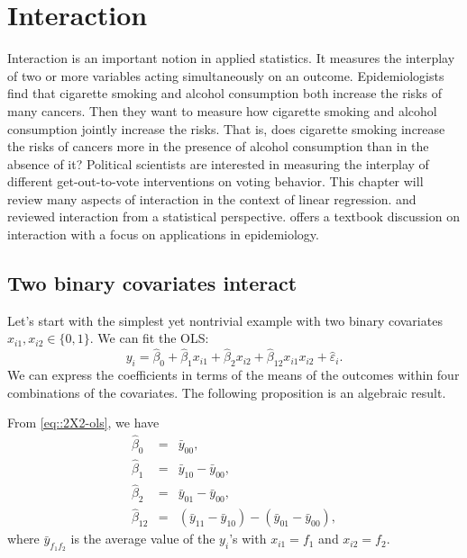  
\chapter{Interaction}\label{chapter::interaction}
 
 Interaction is an important notion in applied statistics. It measures the interplay of two or more variables acting simultaneously on an outcome. Epidemiologists find that cigarette smoking and alcohol consumption both increase the risks of many cancers. Then they want to measure how cigarette smoking and alcohol consumption jointly increase the risks. That is, does cigarette smoking increase the risks of cancers more in the presence of alcohol consumption than in the absence of it? Political scientists are interested in measuring the interplay of different get-out-to-vote interventions on voting behavior. This chapter will review many aspects of interaction in the context of linear regression. \citet{Cox:1984tx} and \citet{berrington2007interpretation} reviewed interaction from a statistical perspective. \citet{Vanderweele::2015} offers a textbook discussion on interaction with a focus on applications in epidemiology. 
 
 
 
  
\section{Two binary covariates interact} 

Let's start with the simplest yet nontrivial example with two binary covariates $x_{i1}, x_{i2} \in \{0, 1\}$. We can fit the OLS:
\begin{equation}
\label{eq::2X2-ols}
y_i=\hat{\beta}_{0}+\hat{\beta}_{1} x_{i1}+\hat{\beta}_{2} x_{i2}+\hat{\beta}_{12} x_{i1} x_{i2}+\hat{\varepsilon}_i. 
\end{equation}
We can express the coefficients in terms of the means of the outcomes within four combinations of the covariates. The following proposition
is an algebraic result.


\begin{proposition}\label{proposition::2X2-ols}
From \eqref{eq::2X2-ols}, we have
\begin{eqnarray*} 
\hat{\beta}_{0} &=& \bar{y}_{00}, \\
\hat{\beta}_{1} &=& \bar{y}_{10} - \bar{y}_{00}, \\
\hat{\beta}_{2} &=& \bar{y}_{01}-\bar{y}_{00}, \\
\hat{\beta}_{12} &=& (\bar{y}_{11}-\bar{y}_{10})-(\bar{y}_{01}-\bar{y}_{00}),   
\end{eqnarray*} 
where $\bar{y}_{f_{1}f_{2}}$ is the average value of the $y_{i}$'s
with $x_{i1} = f_{1}$ and $x_{i2} = f_{2}$. 
\end{proposition}

